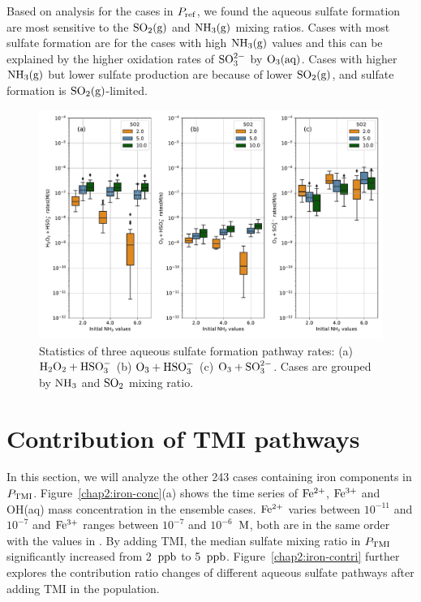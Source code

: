 \documentclass[edeposit,fullpage]{uiucthesis2009}
\makeatletter
\DeclareRobustCommand*\unit[1]
 {\ensuremath{%
   {\thinmuskip3mu\relax
    \def\mu{\text{\textmu}}\def~{\,}%
    \ifx\f@series\testbx\mathbf{#1}\else\mathrm{#1}\fi}}}
\makeatother
\begin{document}
Based on analysis for the cases in $P_{\rm ref}$, we found the aqueous sulfate formation are most sensitive to the $\rm SO_2(g)$ and $\rm NH_3(g)$ mixing ratios. Cases with most sulfate formation are for the cases with high $\rm NH_3(g)$ values and this can be explained by the higher oxidation rates of $\rm SO_3^{2-}$ by $\rm O_3(aq)$. Cases with higher $\rm NH_3(g)$ but lower sulfate production are because of lower $\rm SO_2(g)$, and sulfate formation is $\rm SO_2(g)$-limited. 

\begin{figure}[ht]
    \centering \includegraphics[scale=0.55]{chap2_figs/chap2_fig5_sulfate_rates_3min.pdf}
    \caption{Statistics of three aqueous sulfate formation pathway rates: (a) $\rm H_2O_2+ HSO_3^-$ (b) $\rm O_3+ HSO_3^-$ (c) $\rm O_3+ SO_3^{2-}$. Cases are grouped by $\rm NH_3$ and $\rm SO_2$ mixing ratio.}
    \label{chap2:reac-rates}
\end{figure}

\section{Contribution of TMI pathways}

In this section, we will analyze the other 243 cases containing iron components in $P_{\rm TMI}$. Figure~\ref{chap2:iron-conc}(a) shows the time series of $\rm Fe^{2+}$, $\rm Fe^{3+}$ and OH(aq) mass concentration in the ensemble cases. $\rm Fe^{2+}$ varies between $10^{-11}$ and $10^{-7}$ and $\rm Fe^{3+}$ ranges between $10^{-7}$ and $10^{-6}$~\unit{M}, both are in the same order with the values in \citep{Deguillaume2005}. By adding TMI, the median sulfate mixing ratio in $P_{\rm TMI}$ significantly increased from 2~\unit{ppb} to 5~\unit{ppb}. Figure~\ref{chap2:iron-contri} further explores the contribution ratio changes of different aqueous sulfate pathways after adding TMI in the population. 
\end{document}
